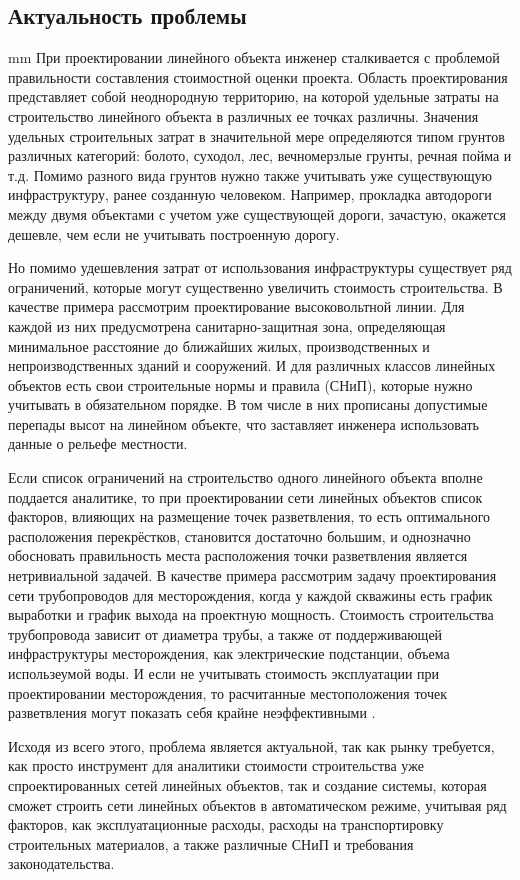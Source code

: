 \subsection*{\Large{Актуальность проблемы}}
 mm
При проектировании линейного объекта инженер сталкивается с проблемой правильности составления стоимостной оценки проекта. Область проектирования представляет собой неоднородную территорию, на которой удельные затраты на строительство линейного объекта в различных ее точках различны. Значения удельных строительных затрат в значительной мере определяются типом грунтов различных категорий: болото, суходол, лес, вечномерзлые грунты, речная пойма и т.д. Помимо разного вида грунтов нужно также учитывать уже существующую инфраструктуру, ранее созданную человеком. Например, прокладка автодороги между двумя объектами с учетом уже существующей дороги, зачастую, окажется дешевле, чем если не учитывать построенную дорогу.
\par
Но помимо удешевления затрат от использования инфраструктуры существует ряд ограничений, которые могут существенно увеличить стоимость строительства. В качестве примера рассмотрим проектирование высоковольтной линии. Для каждой из них предусмотрена санитарно-защитная зона, определяющая минимальное расстояние до ближайших жилых, производственных и непроизводственных зданий и сооружений. И для различных классов линейных объектов есть свои строительные нормы и правила (СНиП), которые нужно учитывать в обязательном порядке. В том числе в них прописаны допустимые перепады высот на линейном объекте, что заставляет инженера использовать данные о рельефе местности.
\par
Если список ограничений на строительство одного линейного объекта вполне поддается аналитике, то при проектировании сети линейных объектов список факторов, влияющих на размещение точек разветвления, то есть оптимального расположения перекрёстков, становится достаточно большим, и однозначно обосновать правильность места расположения точки разветвления является нетривиальной задачей. В качестве примера рассмотрим задачу проектирования сети трубопроводов для месторождения, когда у каждой скважины есть график выработки и график выхода на проектную мощность. Стоимость строительства трубопровода зависит от диаметра трубы, а также от поддерживающей инфраструктуры месторождения, как электрические подстанции, объема использеумой воды. И если не учитывать стоимость эксплуатации при проектировании месторождения, то расчитанные местоположения точек разветвления могут показать себя крайне неэффективными \cite{GasAndOil}.
\par
Исходя из всего этого, проблема является актуальной, так как рынку требуется, как просто инструмент для аналитики стоимости строительства уже спроектированных сетей линейных объектов, так и создание системы, которая сможет строить сети линейных объектов в автоматическом режиме, учитывая ряд факторов, как эксплуатационные расходы, расходы на транспортировку строительных материалов, а также различные СНиП и требования законодательства.


